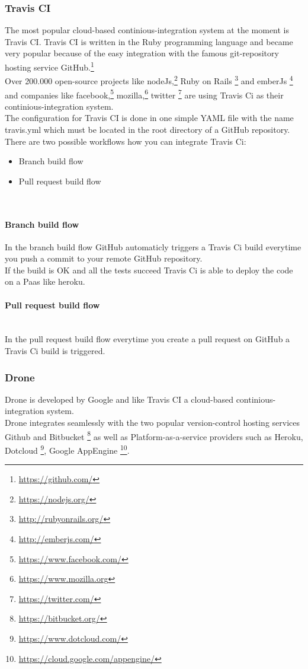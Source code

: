 \subsubsection{Travis CI}
The most popular cloud-based continious-integration system at the moment is Travis CI.
Travis CI is written in the Ruby programming language and became very popular because of the easy integration with the famous git-repository hosting service GitHub.\footnote{\url{https://github.com/}}\\
Over 200.000 open-source projects like nodeJs,\footnote{\url{https://nodejs.org/}}
 Ruby on Rails \footnote{\url{http://rubyonrails.org/}}
and emberJs \footnote{\url{http://emberjs.com/}}
and companies like facebook,\footnote{\url{https://www.facebook.com/}}
 mozilla,\footnote{\url{https://www.mozilla.org}}
 twitter \footnote{\url{https://twitter.com/}}
are using Travis Ci as their continious-integration system.\\
The configuration for Travis CI is done in one simple YAML file with the name travis.yml 
which must be located in the root directory of a GitHub repository.
There are two possible workflows how you can integrate Travis Ci:
\begin{itemize} 
    \item Branch build flow
    \item Pull request build flow
\end{itemize}\\
\paragraph{Branch build flow}
In the branch build flow GitHub automaticly triggers a Travis Ci build everytime you 
push a commit to your remote GitHub repository.\\
If the build is OK and all the tests succeed Travis Ci is able to deploy the 
code on a Paas like heroku.
\paragraph{Pull request build flow}
\\
In the pull request build flow everytime you create a pull request on GitHub a Travis Ci build is triggered.

\subsubsection{Drone}

Drone is developed by Google and like Travis CI a cloud-based continious-integration system.\\
Drone integrates seamlessly with the two popular version-control hosting services 
Github and Bitbucket \footnote{\url{https://bitbucket.org/}}
as well as Platform-as-a-service providers such as Heroku, Dotcloud \footnote{\url{https://www.dotcloud.com/}},
Google AppEngine  \footnote{\url{https://cloud.google.com/appengine/}}.

